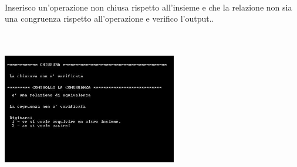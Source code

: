 \documentclass[11pt,a4paper,titlepage,block]{article}
\begin{document}
\\
\newpage
Inserisco un'operazione non chiusa rispetto all'insieme e che la relazione non sia una congruenza rispetto all'operazione e verifico l'output..\\
\includegraphics[width=3in,height=3in,viewport=0 0 300 300]{../Screenshots/Capture8.JPG}	
\end{document}
